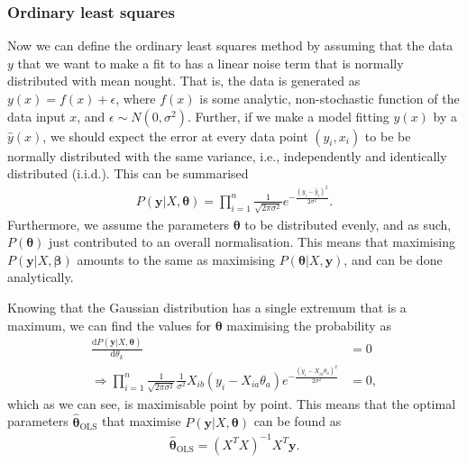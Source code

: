 \documentclass[twocolumn,english,notitlepage]{article}
\renewcommand{\d}[2][x]{\ensuremath{\frac{\mathrm{d}#2}{\mathrm{d}#1}}}
\renewcommand{\vec}[1]{\boldsymbol{#1}}
\newcommand{\pclosed}[1]{\left(#1\right)}
\renewcommand{\exp}[1]{e^{#1}}
\newcommand{\msub}[2]{\ensuremath{{#1}_\text{#2}}}
\begin{document}
        \subsubsection{Ordinary least squares}
            Now we can define the ordinary least squares method by assuming that the data $y$ that we want to make a fit to has a linear noise term that is normally distributed with mean nought. That is, the data is generated as $y(x) = f(x) + \epsilon$, where $f(x)$ is some analytic, non-stochastic function of the data input $x$, and $\epsilon \sim N(0, \sigma^2)$. Further, if we make a model fitting $y(x)$ by a $\hat{y}(x)$, we should expect the error at every data point $(y_i, x_i)$ to be be normally distributed with the same variance, i.e., independently and identically distributed (i.i.d.). This can be summarised
            \begin{align}
                P(\vec{y}|X, \vec{\theta}) = \prod_{i=1}^{n} \frac{1}{\sqrt{2\pi\sigma^2}} \exp{-\frac{{(y_i-\hat{y}_i)}^2}{2\sigma^2}}.
            \end{align}
            Furthermore, we assume the parameters $\vec{\theta}$ to be distributed evenly, and as such, $P(\vec{\theta})$ just contributed to an overall normalisation. This means that maximising $P(\vec{y}|X, \vec{\beta})$ amounts to the same as maximising $P(\vec{\theta}|X, \vec{y})$, and can be done analytically.

            Knowing that the Gaussian distribution has a single extremum that is a maximum, we can find the values for $\vec{\theta}$ maximising the probability as
            \begin{align} \nonumber
                \d[\theta_k]{P(\vec{y}|X,\vec{\theta})} &= 0 \\
                \Rightarrow \prod_{i=1}^{n} \frac{1}{\sqrt{2\pi\sigma^2}} \frac{1}{\sigma^2} X_{ib}(y_i-X_{ia}\theta_a) \exp{-\frac{{(y_i - X_{ia}\theta_a)}^2}{2\sigma^2}} &= 0,
            \end{align}
            which as we can see, is maximisable point by point. This means that the optimal parameters $\msub{\vec{\hat{\theta}}}{OLS}$ that maximise $P(\vec{y}|X, \vec{\theta})$ can be found as
            \begin{align}
                \boxed{
                \msub{\vec{\hat{\theta}}}{OLS} = \pclosed{X^TX}^{-1} X^T \vec{y}.
                }
            \end{align}
\end{document}
